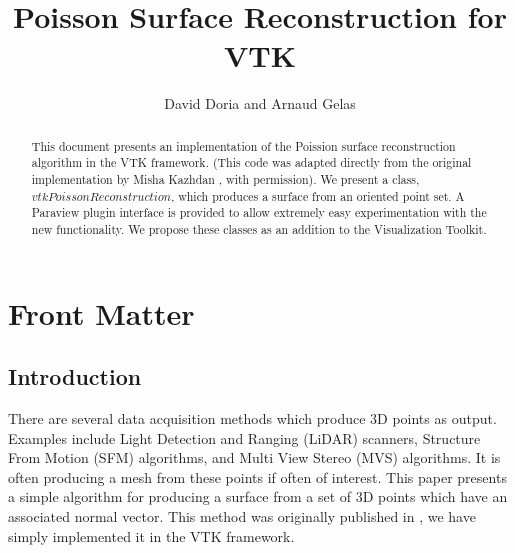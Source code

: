 \documentclass{InsightArticle}
\title{Poisson Surface Reconstruction for VTK}
\author{David Doria and Arnaud Gelas}
\newcommand{\IJhandlerIDnumber}{3149}
\begin{document}
%
% 
\IJhandlefooter{\IJhandlerIDnumber}


\ifpdf
\else
\fi


\maketitle


\ifhtml
\chapter*{Front Matter\label{front}}
\fi


\begin{abstract}
\noindent
This document presents an implementation of the Poission surface reconstruction algorithm in the VTK framework. (This code was adapted directly from the original implementation by Misha Kazhdan \cite{reconstruction}, with permission). We present a class, $vtkPoissonReconstruction$, which produces a surface from an oriented point set. A Paraview plugin interface is provided to allow extremely easy experimentation with the new functionality. We propose these classes as an addition to the Visualization Toolkit.

\end{abstract}

\IJhandlenote{\IJhandlerIDnumber}

\tableofcontents

\section{Introduction}
There are several data acquisition methods which produce 3D points as output. Examples include Light Detection and Ranging (LiDAR) scanners, Structure From Motion (SFM) algorithms, and Multi View Stereo (MVS) algorithms. It is often producing a mesh from these points if often of interest. This paper presents a simple algorithm for producing a surface from a set of 3D points which have an associated normal vector. This method was originally published in \cite{reconstruction}, we have simply implemented it in the VTK framework.
\end{document}

